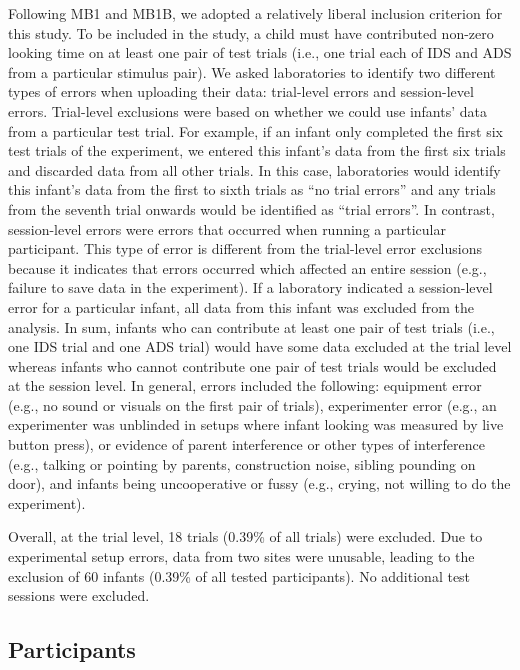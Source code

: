 \documentclass[
  ,man,floatsintext]{apa6}
\begin{document}
Following MB1 and MB1B, we adopted a relatively liberal inclusion criterion for this study. To be included in the study, a child must have contributed non-zero looking time on at least one pair of test trials (i.e., one trial each of IDS and ADS from a particular stimulus pair). We asked laboratories to identify two different types of errors when uploading their data: trial-level errors and session-level errors. Trial-level exclusions were based on whether we could use infants' data from a particular test trial. For example, if an infant only completed the first six test trials of the experiment, we entered this infant's data from the first six trials and discarded data from all other trials. In this case, laboratories would identify this infant's data from the first to sixth trials as ``no trial errors'' and any trials from the seventh trial onwards would be identified as ``trial errors''. In contrast, session-level errors were errors that occurred when running a particular participant. This type of error is different from the trial-level error exclusions because it indicates that errors occurred which affected an entire session (e.g., failure to save data in the experiment). If a laboratory indicated a session-level error for a particular infant, all data from this infant was excluded from the analysis. In sum, infants who can contribute at least one pair of test trials (i.e., one IDS trial and one ADS trial) would have some data excluded at the trial level whereas infants who cannot contribute one pair of test trials would be excluded at the session level. In general, errors included the following: equipment error (e.g., no sound or visuals on the first pair of trials), experimenter error (e.g., an experimenter was unblinded in setups where infant looking was measured by live button press), or evidence of parent interference or other types of interference (e.g., talking or pointing by parents, construction noise, sibling pounding on door), and infants being uncooperative or fussy (e.g., crying, not willing to do the experiment).

Overall, at the trial level, 18 trials (0.39\% of all trials) were excluded. Due to experimental setup errors, data from two sites were unusable, leading to the exclusion of 60 infants (0.39\% of all tested participants). No additional test sessions were excluded.

\hypertarget{participants}{%
\subsection{Participants}\label{participants}}
\end{document}
